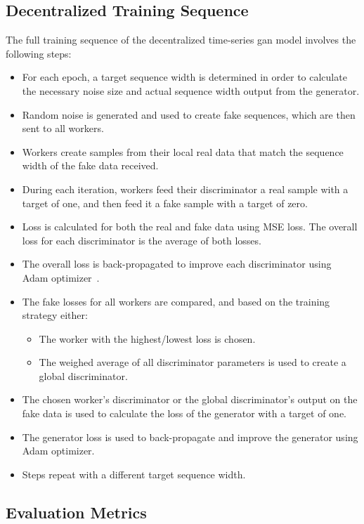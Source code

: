 \subsection{Decentralized Training Sequence}
%
The full training sequence of the decentralized time-series \gls*{gan} model involves the following steps:
%
\begin{itemize}
\item For each epoch, a target sequence width is determined in order to calculate the necessary noise size and actual sequence width output from the generator.
\item Random noise is generated and used to create fake sequences, which are then sent to all workers.
\item Workers create samples from their local real data that match the sequence width of the fake data received.
\item During each iteration, workers feed their discriminator a real sample with a target of one, and then feed it a fake sample with a target of zero.
\item Loss is calculated for both the real and fake data using MSE loss. The overall loss for each discriminator is the average of both losses.
\item The overall loss is back-propagated to improve each discriminator using Adam optimizer~\cite{adam_optimizer}.
\item The fake losses for all workers are compared, and based on the training strategy either:
\begin{itemize}
\item The worker with the highest/lowest loss is chosen.
\item The weighed average of all discriminator parameters is used to create a global discriminator. %
\end{itemize}
\item The chosen worker's discriminator or the global discriminator's output on the fake data is used to calculate the loss of the generator with a target of one.
\item The generator loss is used to back-propagate and improve the generator using Adam optimizer.
\item Steps repeat with a different target sequence width.
\end{itemize}


\subsection{Evaluation Metrics}

